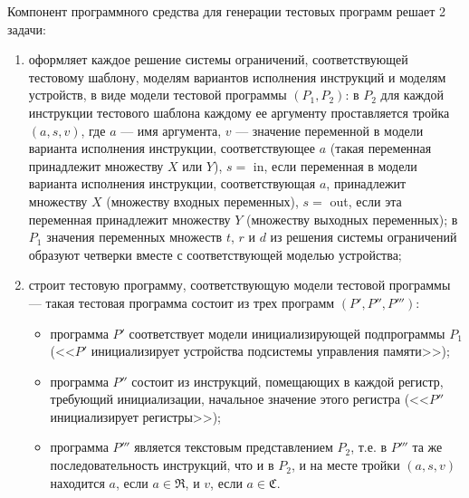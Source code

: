 Компонент программного средства для генерации тестовых программ  решает 2 задачи:
  \begin{enumerate}
    \item оформляет каждое решение системы ограничений, соответствующей тестовому шаблону, моделям вариантов исполнения инструкций и моделям устройств, в виде модели тестовой программы $(P_1, P_2)$: в $P_2$ для каждой инструкции тестового шаблона каждому ее аргументу проставляется тройка $(a, s, v)$, где $a$ --- имя аргумента, $v$ --- значение переменной в модели варианта исполнения инструкции, соответствующее $a$ (такая переменная принадлежит множеству $X$ или $Y$), $s =$ in, если переменная в модели варианта исполнения инструкции, соответствующая $a$, принадлежит множеству $X$ (множеству входных переменных), $s =$ out, если эта переменная принадлежит множеству $Y$ (множеству выходных переменных); в $P_1$ значения переменных множеств $t$, $r$ и $d$ из решения системы ограничений образуют четверки вместе с соответствующей моделью устройства;
    \item строит тестовую программу, соответствующую модели тестовой программы --- такая тестовая программа состоит из трех программ $(P', P'', P''')$:
            \begin{itemize}
              \item программа $P'$ соответствует модели инициализирующей подпрограммы $P_1$ (<<$P'$ инициализирует устройства подсистемы управления памяти>>);
               \item программа $P''$ состоит из инструкций, помещающих в каждой регистр, требующий инициализации, начальное значение этого регистра (<<$P''$ инициализирует регистры>>);
               \item программа $P'''$ является текстовым представлением $P_2$, т.е. в $P'''$ та же последовательность инструкций, что и в $P_2$, и на месте тройки $(a, s, v)$ находится $a$, если $a \in \mathfrak{R}$, и $v$, если $a \in \mathfrak{C}$.
            \end{itemize}
  \end{enumerate}

